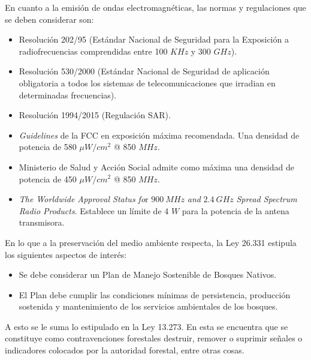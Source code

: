 En cuanto a la emisión de ondas electromagnéticas, las normas y regulaciones que se deben considerar son:
\begin{itemize}
	\item Resolución 202/95 (Estándar Nacional de Seguridad para la Exposición a radiofrecuencias comprendidas entre 100 $KHz$ y 300 $GHz$).
	\item Resolución 530/2000 (Estándar Nacional de Seguridad de aplicación obligatoria a todos los sistemas de telecomunicaciones que irradian en determinadas frecuencias).
	\item Resolución 1994/2015 (Regulación SAR).
	\item \textit{Guidelines} de la FCC en exposición máxima recomendada. Una densidad de potencia de 580 $\mu W/{cm}^2$ @ 850 $MHz$.
	\item Ministerio de Salud y Acción Social admite como máxima una densidad de potencia de 450 $\mu W/{cm}^2$ @ 850 $MHz$.
	\item \textit{The Worldwide Approval Status fo}r $900 \ MHz$ \textit{and} $2.4 \ GHz$ \textit{Spread Spectrum Radio Products}. Establece un límite de 4 $W$ para la potencia de la antena transmisora.
\end{itemize}

En lo que a la preservación del medio ambiente respecta, la Ley 26.331 estipula los siguientes aspectos de interés:
\begin{itemize}
	\item Se debe considerar un Plan de Manejo Sostenible de Bosques Nativos.
	\item El Plan debe cumplir las condiciones mínimas de persistencia, producción sostenida y mantenimiento de los servicios ambientales de los bosques.
\end{itemize}

A esto se le suma lo estipulado en la Ley 13.273. En esta se encuentra que se constituye como contravenciones forestales destruir, remover o suprimir señales o indicadores colocados por la autoridad forestal, entre otras cosas.
